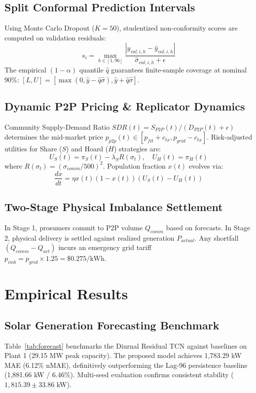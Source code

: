 \documentclass[conference]{IEEEtran}
\begin{document}
\subsection{Split Conformal Prediction Intervals}
Using Monte Carlo Dropout ($K=50$), studentized non-conformity scores are computed on validation residuals:
\begin{equation}
s_i = \max_{h \in [1, 96]} \frac{|y_{val, i, h} - \hat{y}_{val, i, h}|}{\hat{\sigma}_{val, i, h} + \epsilon}
\end{equation}
The empirical $(1-\alpha)$ quantile $\hat{q}$ guarantees finite-sample coverage at nominal 90\%: $[L, U] = [\max(0, \hat{y} - \hat{q}\hat{\sigma}), \hat{y} + \hat{q}\hat{\sigma}]$.

\subsection{Dynamic P2P Pricing \& Replicator Dynamics}
Community Supply-Demand Ratio $SDR(t) = S_{P2P}(t)/(D_{P2P}(t) + \epsilon)$ determines the mid-market price $p_{p2p}(t) \in [p_{fit} + c_{tx}, p_{grid} - c_{tx}]$. Risk-adjusted utilities for Share ($S$) and Hoard ($H$) strategies are:
\begin{equation}
U_S(t) = \pi_S(t) - \lambda_S R(\sigma_t), \quad U_H(t) = \pi_H(t)
\end{equation}
where $R(\sigma_t) = (\sigma_{comm}/500)^2$. Population fraction $x(t)$ evolves via:
\begin{equation}
\frac{dx}{dt} = \eta x(t)(1 - x(t))(U_S(t) - U_H(t))
\end{equation}

\subsection{Two-Stage Physical Imbalance Settlement}
In Stage 1, prosumers commit to P2P volume $Q_{comm}$ based on forecasts. In Stage 2, physical delivery is settled against realized generation $P_{actual}$. Any shortfall $(Q_{comm} - Q_{act})$ incurs an emergency grid tariff $p_{imb} = p_{grid} \times 1.25 = \$0.275/\text{kWh}$.

\section{Empirical Results}
\subsection{Solar Generation Forecasting Benchmark}
Table~\ref{tab:forecast} benchmarks the Diurnal Residual TCN against baselines on Plant 1 (29.15 MW peak capacity). The proposed model achieves 1,783.29 kW MAE (6.12\% nMAE), definitively outperforming the Lag-96 persistence baseline (1,881.66 kW / 6.46\%). Multi-seed evaluation confirms consistent stability ($1,815.39 \pm 33.86$ kW).
\end{document}
